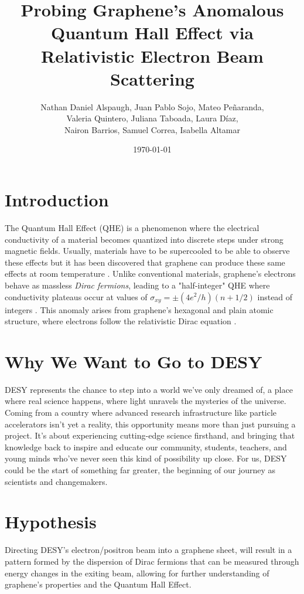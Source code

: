\documentclass[12pt, a4paper]{article}
\title{Probing Graphene's Anomalous Quantum Hall Effect via Relativistic Electron Beam Scattering}
\author{Nathan Daniel Alspaugh, Juan Pablo Sojo, Mateo Peñaranda, \\Valeria Quintero, Juliana Taboada, Laura Díaz, \\Nairon Barrios, Samuel Correa, Isabella Altamar}
\date{\today}
\begin{document}
\maketitle

\section{Introduction}
The Quantum Hall Effect (QHE) is a phenomenon where the electrical conductivity of a material becomes quantized into discrete steps under strong magnetic fields. Usually, materials have to be supercooled to be able to observe these effects but it has been discovered that graphene can produce these same effects at room temperature \cite{Novoselov2007}. Unlike conventional materials, graphene's electrons behave as massless \textit{Dirac fermions}, leading to a "half-integer" QHE where conductivity plateaus occur at values of \(\sigma_{xy} = \pm(4e^2/h)(n + 1/2)\) instead of integers \cite{hsu2010anomalous}. This anomaly arises from graphene's hexagonal and plain atomic structure, where electrons follow the relativistic Dirac equation \cite{semenoff1984condensed}.

\section{Why We Want to Go to DESY}
DESY represents the chance to step into a world we've only dreamed of, a place where real science happens, where light unravels the mysteries of the universe. Coming from a country where advanced research infrastructure like particle accelerators isn't yet a reality, this opportunity means more than just pursuing a project. It's about experiencing cutting-edge science firsthand, and bringing that knowledge back to inspire and educate our community, students, teachers, and young minds who've never seen this kind of possibility up close. For us, DESY could be the start of something far greater, the beginning of our journey as scientists and changemakers.

\section{Hypothesis}
Directing DESY's electron/positron beam into a graphene sheet, will result in a pattern formed by the dispersion of Dirac fermions that can be measured through energy changes in the exiting beam, allowing for further understanding of graphene's properties and the Quantum Hall Effect.
\end{document}
